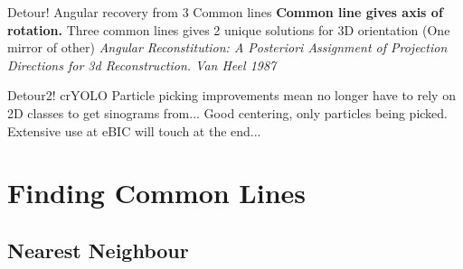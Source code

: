 \documentclass[t, 11pt]{beamer}
\begin{document}
\begin{frame}[fragile]{Detour! Angular recovery from 3 Common lines}
  \textbf{Common line gives axis of rotation.}
  Three common lines gives 2 unique solutions for 3D orientation (One mirror of other)
  \textit{\tiny{Angular Reconstitution: A Posteriori Assignment of Projection Directions for 3d Reconstruction. Van Heel 1987}}
\end{frame}


\begin{frame}[fragile]{Detour2! crYOLO}
  Particle picking improvements mean no longer have to rely on 2D classes to get sinograms from...
  Good centering, only particles being picked.
  Extensive use at eBIC will touch at the end...
\end{frame}


\section{Finding Common Lines}
\subsection*{Nearest Neighbour}
\end{document}

